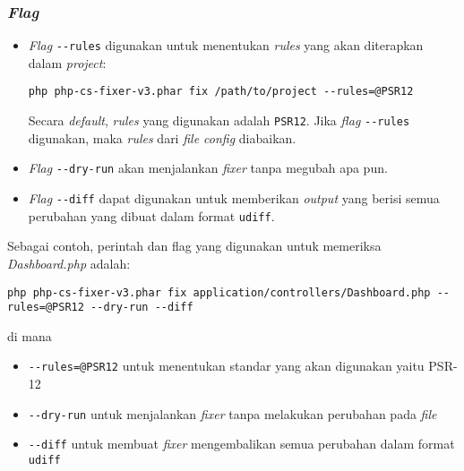 \subsubsection{\textit{Flag}}
\begin{itemize}
	\item \textit{Flag} \verb|--rules| digunakan untuk menentukan \textit{rules} yang akan diterapkan dalam \textit{project}:
	\begin{lstlisting}[basicstyle=\ttfamily, frame=single,
		columns=fullflexible, keepspaces=true, breaklines=true, label=ls:1]
		php php-cs-fixer-v3.phar fix /path/to/project --rules=@PSR12
	\end{lstlisting}
	Secara \textit{default}, \textit{rules} yang digunakan adalah \verb|PSR12|. Jika \textit{flag} \verb|--rules| digunakan, maka \textit{rules} dari \textit{file config} diabaikan.
	\item \textit{Flag} \verb|--dry-run| akan menjalankan \textit{fixer} tanpa megubah apa pun.
	\item \textit{Flag} \verb|--diff| dapat digunakan untuk memberikan \textit{output} yang berisi semua perubahan yang dibuat dalam format \verb|udiff|.
\end{itemize}


Sebagai contoh, perintah dan flag yang digunakan untuk memeriksa \textit{Dashboard.php} adalah:
\begin{lstlisting}[basicstyle=\ttfamily, frame=single,
	columns=fullflexible, keepspaces=true, breaklines=true, label=ls:1]
	php php-cs-fixer-v3.phar fix application/controllers/Dashboard.php --rules=@PSR12 --dry-run --diff
\end{lstlisting}
di mana
\begin{itemize}
	\item \verb|--rules=@PSR12| untuk menentukan standar yang akan digunakan yaitu PSR-12
	\item \verb|--dry-run| untuk menjalankan \textit{fixer} tanpa melakukan perubahan pada \textit{file}
	\item \verb|--diff| untuk membuat \textit{fixer} mengembalikan semua perubahan dalam format \verb|udiff|
\end{itemize}



